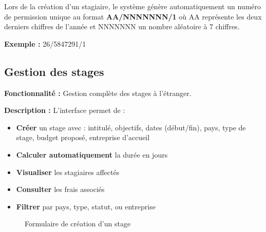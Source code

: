 \documentclass[12pt,a4paper]{report}
\begin{document}
Lors de la création d'un stagiaire, le système génère automatiquement un numéro de permission unique au format \textbf{AA/NNNNNNN/1} où AA représente les deux derniers chiffres de l'année et NNNNNNN un nombre aléatoire à 7 chiffres.

\textbf{Exemple :} 26/5847291/1

\subsection{Gestion des stages}

\textbf{Fonctionnalité :} Gestion complète des stages à l'étranger.

\textbf{Description :} L'interface permet de :

\begin{itemize}[leftmargin=1cm]
    \item \textbf{Créer} un stage avec : intitulé, objectifs, dates (début/fin), pays, type de stage, budget proposé, entreprise d'accueil
    \item \textbf{Calculer automatiquement} la durée en jours
    \item \textbf{Visualiser} les stagiaires affectés
    \item \textbf{Consulter} les frais associés
    \item \textbf{Filtrer} par pays, type, statut, ou entreprise
\end{itemize}

\begin{figure}[H]
\centering
{}
\caption{Formulaire de création d'un stage}
\end{figure}
\end{document}
